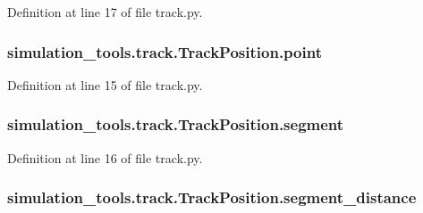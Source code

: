 Definition at line 17 of file track.\+py.

\subsubsection[{\texorpdfstring{point}{point}}]{\setlength{\rightskip}{0pt plus 5cm}simulation\+\_\+tools.\+track.\+Track\+Position.\+point}\hypertarget{classsimulation__tools_1_1track_1_1_track_position_a5c5ad2aecf6e00e6611e8ad70b38de7b}{}\label{classsimulation__tools_1_1track_1_1_track_position_a5c5ad2aecf6e00e6611e8ad70b38de7b}


Definition at line 15 of file track.\+py.

\subsubsection[{\texorpdfstring{segment}{segment}}]{\setlength{\rightskip}{0pt plus 5cm}simulation\+\_\+tools.\+track.\+Track\+Position.\+segment}\hypertarget{classsimulation__tools_1_1track_1_1_track_position_ab5feb6f2789576c88fe7310f28e4c4db}{}\label{classsimulation__tools_1_1track_1_1_track_position_ab5feb6f2789576c88fe7310f28e4c4db}


Definition at line 16 of file track.\+py.

\subsubsection[{\texorpdfstring{segment\+\_\+distance}{segment_distance}}]{\setlength{\rightskip}{0pt plus 5cm}simulation\+\_\+tools.\+track.\+Track\+Position.\+segment\+\_\+distance}\hypertarget{classsimulation__tools_1_1track_1_1_track_position_a89c184a72d3b1636bf9531de144374e4}{}\label{classsimulation__tools_1_1track_1_1_track_position_a89c184a72d3b1636bf9531de144374e4}


